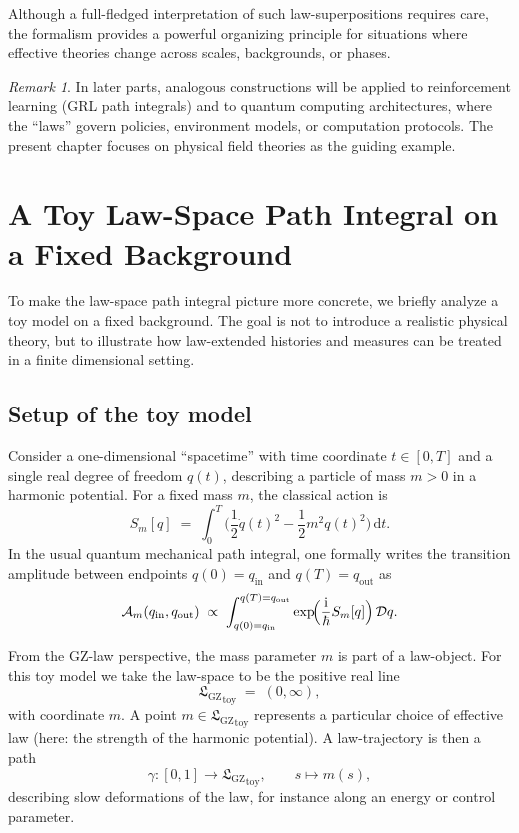 \documentclass[11pt]{book}
\newcommand{\GZLS}{\ensuremath{\mathfrak{L}_{\mathrm{GZ}}}}
\theoremstyle{plain}
\theoremstyle{definition}
\theoremstyle{remark}
\newtheorem{remark}[theorem]{Remark}
\begin{document}
Although a full-fledged interpretation of such law-superpositions
requires care, the formalism provides a powerful organizing principle
for situations where effective theories change across scales,
backgrounds, or phases.

\begin{remark}
  In later parts, analogous constructions will be applied to
  reinforcement learning (GRL path integrals) and to quantum computing
  architectures, where the ``laws'' govern policies, environment
  models, or computation protocols. The present chapter focuses on
  physical field theories as the guiding example.
\end{remark}

\section{A Toy Law-Space Path Integral on a Fixed Background}
\label{sec:toy-lawspace-fixed-background}


To make the law-space path integral picture more concrete, we briefly
analyze a toy model on a fixed background. The goal is not to
introduce a realistic physical theory, but to illustrate how
law-extended histories and measures can be treated in a finite
dimensional setting.

\subsection*{Setup of the toy model}

Consider a one-dimensional ``spacetime'' with time coordinate
$t \in [0,T]$ and a single real degree of freedom $q(t)$, describing
a particle of mass $m>0$ in a harmonic potential. For a fixed mass
$m$, the classical action is
\[
   S_m[q] \;=\; \int_0^T
   \biggl(
     \frac{1}{2} \dot{q}(t)^2
     - \frac{1}{2} m^2 q(t)^2
   \biggr)\,\mathrm{d}t.
\]
In the usual quantum mechanical path integral, one formally writes
the transition amplitude between endpoints $q(0)=q_{\mathrm{in}}$ and
$q(T)=q_{\mathrm{out}}$ as
\[
   \mathcal{A}_m(q_{\mathrm{in}},q_{\mathrm{out}})
   \;\propto\;
   \int_{q(0)=q_{\mathrm{in}}}^{q(T)=q_{\mathrm{out}}}
   \exp\!\Bigl(\frac{\mathrm{i}}{\hbar} S_m[q]\Bigr)\,\mathcal{D}q.
\]

From the GZ-law perspective, the mass parameter $m$ is part of a
law-object. For this toy model we take the law-space to be the
positive real line
\[
   {\GZLS}_{\mathrm{toy}} \;=\; (0,\infty),
\]
with coordinate $m$. A point $m\in{\GZLS}_{\mathrm{toy}}$ represents a
particular choice of effective law (here: the strength of the
harmonic potential). A law-trajectory is then a path
\[
   \gamma \colon [0,1] \longrightarrow {\GZLS}_{\mathrm{toy}},
   \qquad
   s \longmapsto m(s),
\]
describing slow deformations of the law, for instance along an energy
or control parameter.
\end{document}
